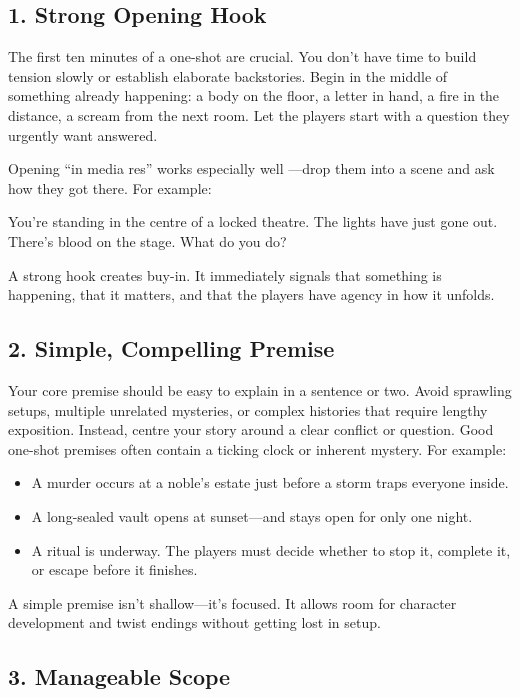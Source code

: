 \subsection*{1. Strong Opening Hook}

The first ten minutes of a one-shot are crucial. You don’t have time to build tension slowly or establish elaborate backstories. Begin in the middle of something already happening: a body on the floor, a letter in hand, a fire in the distance, a scream from the next room. Let the players start with a question they urgently want answered.

Opening “in media res” works especially well —drop them into a scene and ask how they got there. For example:
\begin{Example}{}
    You’re standing in the centre of a locked theatre. The lights have just gone out. There’s blood on the stage. What do you do?
\end{Example}

A strong hook creates buy-in. It immediately signals that something is happening, that it matters, and that the players have agency in how it unfolds.

\subsection*{2. Simple, Compelling Premise}

Your core premise should be easy to explain in a sentence or two. Avoid sprawling setups, multiple unrelated mysteries, or complex histories that require lengthy exposition. Instead, centre your story around a clear conflict or question. Good one-shot premises often contain a ticking clock or inherent mystery. For example:
\begin{itemize}
    \item A murder occurs at a noble’s estate just before a storm traps everyone inside.
    \item A long-sealed vault opens at sunset—and stays open for only one night.
    \item A ritual is underway. The players must decide whether to stop it, complete it, or escape before it finishes.
\end{itemize}

A simple premise isn’t shallow—it’s focused. It allows room for character development and twist endings without getting lost in setup.

\subsection*{3. Manageable Scope}


